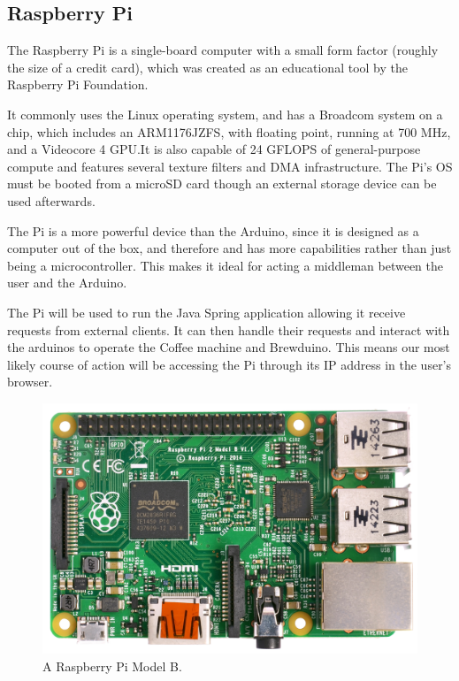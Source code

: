 \documentclass[12pt, a4paper]{article}
\begin{document}
\newpage

\subsection{Raspberry Pi}
The Raspberry Pi is a single-board computer with a small form factor (roughly
the size of a credit card), which was created as an educational tool by the
Raspberry Pi Foundation. 

It commonly uses the Linux operating system, and has a Broadcom system on a
chip, which includes an ARM1176JZFS, with floating point, running at 700 MHz,
and a Videocore 4 GPU.It is also capable of 24 GFLOPS of general-purpose
compute and features several texture filters and DMA infrastructure. The Pi’s OS
must be booted from a microSD card though an external storage device can be used
afterwards.

The Pi is a more powerful device than the Arduino, since it is designed as a
computer out of the box, and therefore and has more capabilities rather than
just being a microcontroller. This makes it ideal for acting a middleman between
the user and the Arduino.

The Pi will be used to run the Java Spring application allowing it receive 
requests from external clients. It can then handle their requests and interact 
with the arduinos to operate the Coffee machine and Brewduino. This means our
most likely course of action will be accessing the Pi through its IP address in
the user's browser.

\begin{figure}[H]
    \centering
    \includegraphics[scale = 0.1]{images/pi}
    \caption{A Raspberry Pi Model B.\cite{PiImage}}
    \label{fig:pi}
\end{figure}
\end{document}
